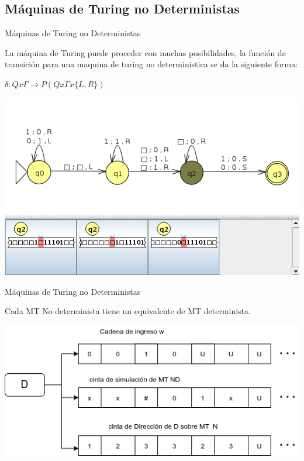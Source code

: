 \documentclass[11pt]{beamer}
\begin{document}
	\subsection{Máquinas de Turing no Deterministas}
	    \begin{frame}{Máquinas de Turing no Deterministas}
			\justifying
			
			La máquina de Turing puede proceder con muchas posibilidades, la función de transición para una maquina de turing no deterministica \cite{jflap} se da la siguiente forma:
			
			$\delta: Q x \Gamma \rightarrow P(Q x \Gamma  x \{L,R\})$
			
			 
			\begin{center}
            \includegraphics[scale=0.4]{img/nodet_mt.png}
			\end{center}
			
		\end{frame}
		
		\begin{frame}{Máquinas de Turing no Deterministas}
			\justifying
			
			\begin{theorem}
                Cada MT No determinista tiene un equivalente de MT determinista.
            \end{theorem}
            \begin{center}
            \includegraphics[scale=0.6]{img/teo1_nd.png}
			\end{center}
			
		\end{frame}
\end{document}
